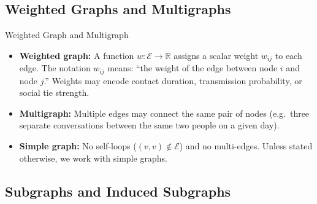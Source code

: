 \begin{center}
\end{center}

\subsection{Weighted Graphs and Multigraphs}

\begin{conceptbox}{Weighted Graph and Multigraph}
\begin{itemize}[noitemsep]
    \item \textbf{Weighted graph:} A function $w: \mathcal{E} \to \mathbb{R}$ assigns a scalar weight $w_{ij}$ to each edge. The notation $w_{ij}$ means: ``the weight of the edge between node $i$ and node $j$.'' Weights may encode contact duration, transmission probability, or social tie strength.
    \item \textbf{Multigraph:} Multiple edges may connect the same pair of nodes (e.g.\ three separate conversations between the same two people on a given day).
    \item \textbf{Simple graph:} No self-loops ($(v,v) \notin \mathcal{E}$) and no multi-edges. Unless stated otherwise, we work with simple graphs.
\end{itemize}
\end{conceptbox}

\subsection{Subgraphs and Induced Subgraphs}

